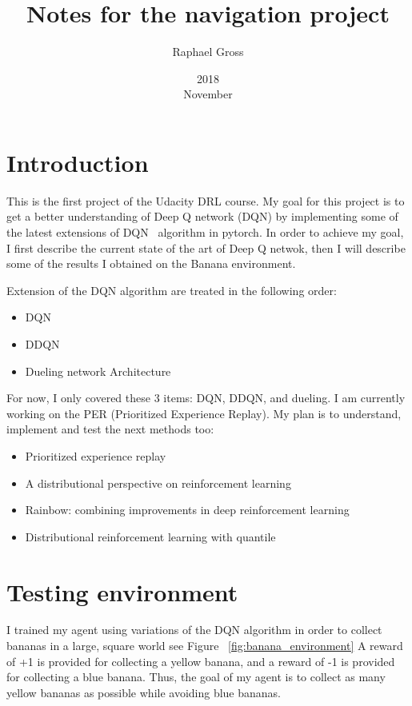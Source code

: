 \documentclass[12pt]{article}
\begin{document}
\title{Notes for the navigation project}
\date{2018\\ November}
\author{Raphael Gross}
\maketitle




\section{Introduction}
This is the first project of the Udacity DRL course. My goal for this project is to get a better understanding of Deep Q network (DQN) by implementing some of the latest extensions of DQN~\cite{mnih2015humanlevel} algorithm in pytorch. In order to achieve my goal, I first describe the current state of the art of Deep Q netwok, then I will describe some of the results I obtained on the Banana environment.

Extension of the DQN  algorithm are treated in the following order:

\begin{itemize}
\item DQN~\cite{mnih2015humanlevel}
\item DDQN~\cite{Hasselt2016}
\item Dueling network Architecture~\cite{Wang2016}
\end{itemize}


For now, I only covered these 3 items: DQN, DDQN, and dueling. I am currently working on the PER (Prioritized Experience Replay). My plan is to understand, implement and test the next methods too:

\begin{itemize}
\item Prioritized experience replay~\cite{Schaul2018}
\item A distributional perspective on reinforcement learning~\cite{BellemareDM17}
\item Rainbow: combining improvements in deep reinforcement learning~\cite{Hessel2017} 
\item Distributional reinforcement learning with quantile~\cite{DabneyRBM18} 
\end{itemize}

\section{Testing environment}
I trained my agent using  variations of the DQN algorithm in order to collect bananas in a large, square world see Figure ~\ref{fig:banana_environment}
A reward of +1 is provided for collecting a yellow banana, and a reward of -1 is provided for collecting a blue banana. Thus, the goal of my agent is to collect as many yellow bananas as possible while avoiding blue bananas.
\end{document}
